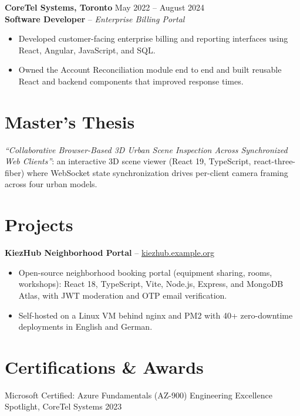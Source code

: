 \documentclass[10pt,a4paper]{article}
\begin{document}
\vspace{2pt}
\textbf{CoreTel Systems, Toronto} \hfill May 2022 -- August 2024\\
\textbf{Software Developer} -- \textit{Enterprise Billing Portal}
\begin{itemize}
    \item Developed customer-facing enterprise billing and reporting interfaces using React, Angular, JavaScript, and SQL.
    \item Owned the Account Reconciliation module end to end and built reusable React and backend components that improved response times.
\end{itemize}

\section*{Master's Thesis}
\textit{``Collaborative Browser-Based 3D Urban Scene Inspection Across Synchronized Web Clients''}: an interactive 3D scene viewer (React 19, TypeScript, react-three-fiber) where WebSocket state synchronization drives per-client camera framing across four urban models.

\section*{Projects}
\textbf{KiezHub Neighborhood Portal} -- \href{https://kiezhub.example.org}{kiezhub.example.org}
\begin{itemize}
    \item Open-source neighborhood booking portal (equipment sharing, rooms, workshops): React 18, TypeScript, Vite, Node.js, Express, and MongoDB Atlas, with JWT moderation and OTP email verification.
    \item Self-hosted on a Linux VM behind nginx and PM2 with 40+ zero-downtime deployments in English and German.
\end{itemize}

\section*{Certifications \& Awards}
Microsoft Certified: Azure Fundamentals (AZ-900) \textbar{} Engineering Excellence Spotlight, CoreTel Systems 2023
\end{document}
